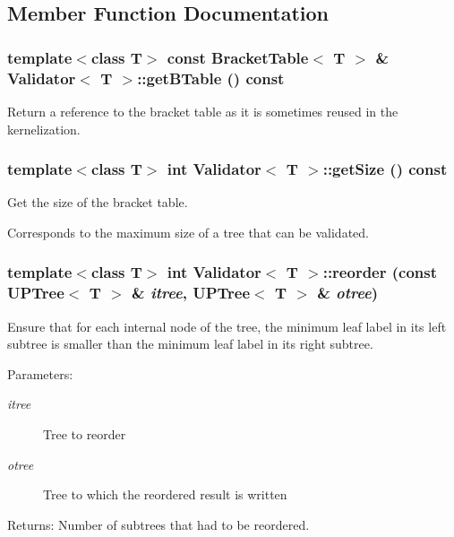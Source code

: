 \subsection{Member Function Documentation}
\subsubsection{\setlength{\rightskip}{0pt plus 5cm}template$<$class T$>$ const {\bf Bracket\-Table}$<$ T $>$ \& {\bf Validator}$<$ T $>$::get\-BTable () const\hspace{0.3cm}{\tt  [inline]}}\label{classValidator_a6}


Return a reference to the bracket table as it is sometimes reused in the kernelization. 

\subsubsection{\setlength{\rightskip}{0pt plus 5cm}template$<$class T$>$ int {\bf Validator}$<$ T $>$::get\-Size () const\hspace{0.3cm}{\tt  [inline]}}\label{classValidator_a7}


Get the size of the bracket table. 

Corresponds to the maximum size of a tree that can be validated. 
\subsubsection{\setlength{\rightskip}{0pt plus 5cm}template$<$class T$>$ int {\bf Validator}$<$ T $>$::reorder (const {\bf UPTree}$<$ T $>$ \& {\em itree}, {\bf UPTree}$<$ T $>$ \& {\em otree})}\label{classValidator_a4}


Ensure that for each internal node of the tree, the minimum leaf label in its left subtree is smaller than the minimum leaf label in its right subtree. 

\begin{Desc}
\item[Parameters:]
\begin{description}
\item[{\em itree}]Tree to reorder \item[{\em otree}]Tree to which the reordered result is written \end{description}
\end{Desc}
\begin{Desc}
\item[Returns:]Number of subtrees that had to be reordered. \end{Desc}

